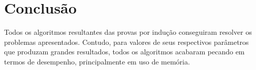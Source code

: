 \documentclass[12pt]{article}
\begin{document}
\newpage
\section{Conclusão}
\indent Todos os algoritmos resultantes das provas por indução conseguiram resolver os problemas apresentados. Contudo, para valores de seus respectivos parâmetros que produzam grandes resultados, todos os algoritmos acabaram pecando em termos de desempenho, principalmente em uso de memória.\\












\end{document}
